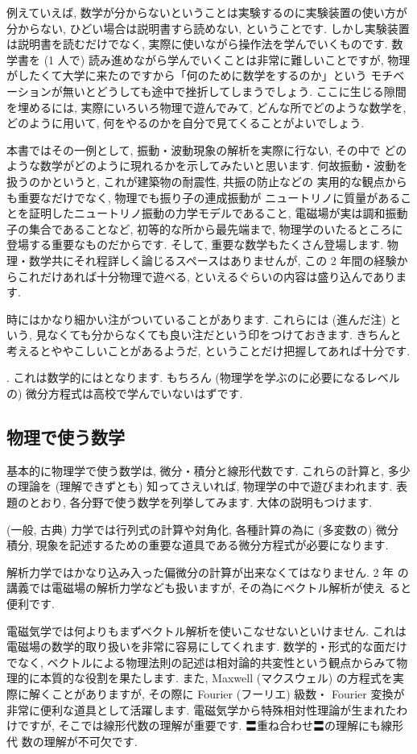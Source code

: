 \documentclass[openany, a4paper, oneside]{jsbook}
\begin{document}
{例えていえば, 数学が分からないということは実験するのに実験装置の使い方が分からない,
ひどい場合は説明書すら読めない, ということです.
しかし実験装置は説明書を読むだけでなく, 実際に使いながら操作法を学んでいくものです.
数学書を (1 人で) 読み進めながら学んでいくことは非常に難しいことですが,
物理がしたくて大学に来たのですから「何のために数学をするのか」という
モチベーションが無いとどうしても途中で挫折してしまうでしょう.
ここに生じる隙間を埋めるには, 実際にいろいろ物理で遊んでみて,
どんな所でどのような数学を, どのように用いて,
何をやるのかを自分で見てくることがよいでしょう.

本書ではその一例として, 振動・波動現象の解析を実際に行ない, その中で
どのような数学がどのように現れるかを示してみたいと思います.
何故振動・波動を扱うのかというと, これが建築物の耐震性, 共振の防止などの
実用的な観点からも重要なだけでなく, 物理でも振り子の連成振動が
ニュートリノに質量があることを証明したニュートリノ振動の力学モデルであること,
電磁場が実は調和振動子の集合であることなど,
初等的な所から最先端まで, 物理学のいたるところに登場する重要なものだからです.
そして, 重要な数学もたくさん登場します.
物理・数学共にそれ程詳しく論じるスペースはありませんが,
この 2 年間の経験からこれだけあれば十分物理で遊べる,
といえるぐらいの内容は盛り込んであります.

時にはかなり細かい注がついていることがあります.
これらには (進んだ注) という,
見なくても分からなくても良い注だという印をつけておきます.
きちんと考えるとややこしいことがあるようだ, ということだけ把握してあれば十分です.}.
これは数学的にはとなります.
もちろん (物理学を学ぶのに必要になるレベルの) 微分方程式は高校で学んでいないはずです.
\subsection{物理で使う数学}

基本的に物理学で使う数学は, 微分・積分と線形代数です.
これらの計算と, 多少の理論を (理解できずとも) 知ってさえいれば,
物理学の中で遊びまわれます.
表題のとおり, 各分野で使う数学を列挙してみます. 大体の説明もつけます.

(一般, 古典) 力学では行列式の計算や対角化, 各種計算の為に (多変数の) 微分
積分, 現象を記述するための重要な道具である微分方程式が必要になります.

解析力学ではかなり込み入った偏微分の計算が出来なくてはなりません. 2 年
の講義では電磁場の解析力学なども扱いますが, その為にベクトル解析が使え
ると便利です.

電磁気学では何よりもまずベクトル解析を使いこなせないといけません. これは
電磁場の数学的取り扱いを非常に容易にしてくれます. 数学的・形式的な面だけ
でなく, ベクトルによる物理法則の記述は相対論的共変性という観点からみて物
理的に本質的な役割を果たします. また, Maxwell (マクスウェル) の方程式を実
際に解くことがありますが, その際に Fourier (フーリエ) 級数・ Fourier 変換が
非常に便利な道具として活躍します. 電磁気学から特殊相対性理論が生まれたわ
けですが, そこでは線形代数の理解が重要です. 〓重ね合わせ〓の理解にも線形代
数の理解が不可欠です.
\end{document}
